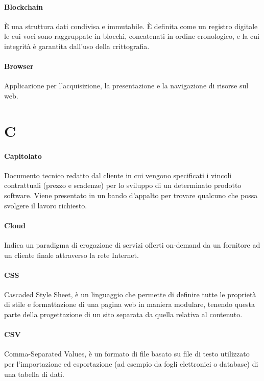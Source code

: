 \documentclass[]{article}
\begin{document}
	\paragraph*{Blockchain}
	È una struttura dati condivisa e immutabile. È definita come un registro digitale le cui voci sono raggruppate in blocchi, concatenati in ordine cronologico, e la cui integrità è garantita dall'uso della crittografia.
	
	\paragraph*{Browser}
	Applicazione per l'acquisizione, la presentazione e la navigazione di risorse sul web.
	
	\newpage
	
	\section*{C}
	
	\paragraph*{Capitolato}
	Documento tecnico redatto dal cliente in cui vengono specificati i vincoli contrattuali	(prezzo e scadenze) per lo sviluppo di un determinato prodotto software. Viene presentato in un bando d'appalto per trovare qualcuno che possa svolgere il lavoro richiesto.
	
	\paragraph*{Cloud}
	Indica un paradigma di erogazione di servizi offerti on-demand da un fornitore ad un cliente finale attraverso la rete Internet.
	
	\paragraph*{CSS}
	Cascaded Style Sheet, è un linguaggio che permette di definire tutte le proprietà di stile e formattazione di una pagina web in maniera modulare, tenendo questa parte della progettazione di un sito separata da quella relativa al contenuto.
	
	\paragraph*{CSV}
	Comma-Separated Values, è un formato di file basato su file di testo utilizzato per l'importazione ed esportazione (ad esempio da fogli elettronici o database) di una tabella di dati.
\end{document}
